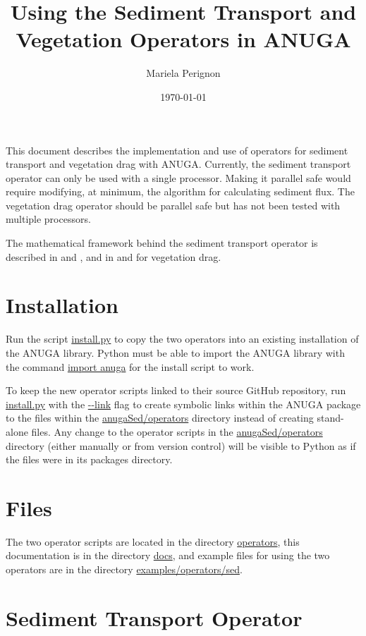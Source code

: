 \documentclass[10pt]{article}
\begin{document}
\title{Using the Sediment Transport and Vegetation Operators in ANUGA}
\author{Mariela Perignon}
\date{\today}
\maketitle

This document describes the implementation and use of operators for sediment transport and vegetation drag with ANUGA. Currently, the sediment transport operator can only be used with a single processor. Making it parallel safe would require modifying, at minimum, the algorithm for calculating sediment flux. The vegetation drag operator should be parallel safe but has not been tested with multiple processors.

The mathematical framework behind the sediment transport operator is described in \citet{Simpson:2006aa} and \citet{davy2009fluvial}, and in \citet{nepf1999drag} and \citet{kean2006form} for vegetation drag.

\section{Installation}

Run the script \url{install.py} to copy the two operators into an existing installation of the ANUGA library. Python must be able to import the ANUGA library with the command \url{import anuga} for the install script to work.

To keep the new operator scripts linked to their source GitHub repository, run \url{install.py} with the \url{--link} flag to create symbolic links within the ANUGA package to the files within the \url{anugaSed/operators} directory instead of creating stand-alone files. Any change to the operator scripts in the \url{anugaSed/operators} directory (either manually or from version control) will be visible to Python as if the files were in its packages directory.
 
\section{Files}

The two operator scripts are located in the directory \url{operators}, this documentation is in the directory \url{docs}, and example files for using the two operators are in the directory \url{examples/operators/sed}.

\section{Sediment Transport Operator}
\end{document}
